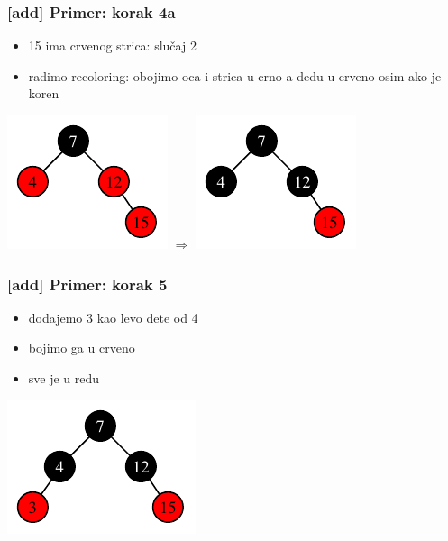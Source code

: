 \documentclass[compress,aspectratio=169]{beamer}
\begin{document}
\begin{frame}[fragile]
  \frametitle{[add] Primer: korak 4a}
  \begin{itemize}
    \item 15 ima crvenog strica: slučaj 2
    \item radimo recoloring: obojimo oca i strica u crno a dedu u crveno osim ako je koren
  \end{itemize}
  \begin{center}
    \includegraphics[scale=1.0]{asp-11-add-05.pdf} $\Rightarrow$
    \includegraphics[scale=1.0]{asp-11-add-06.pdf}
  \end{center}
\end{frame}

\begin{frame}[fragile]
  \frametitle{[add] Primer: korak 5}
  \begin{itemize}
    \item dodajemo 3 kao levo dete od 4
    \item bojimo ga u crveno
    \item sve je u redu
  \end{itemize}
  \begin{center}
    \includegraphics[scale=1.0]{asp-11-add-07.pdf}
  \end{center}
\end{frame}
\end{document}
